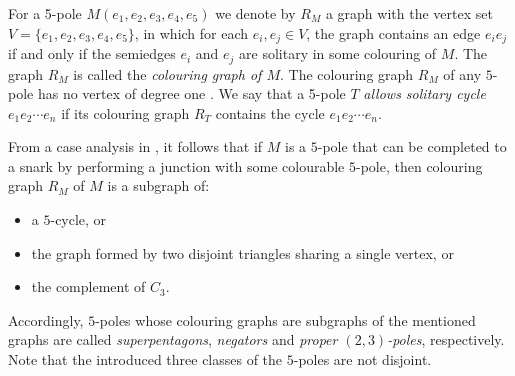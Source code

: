 For a 5-pole $M(e_1,e_2,e_3,e_4,e_5)$ we denote by $R_M$ a graph with the vertex set $V=\{e_1,e_2,e_3,e_4,e_5\}$, in which for each $e_i,e_j\in V$, the graph contains an edge $e_ie_j$ if and only if the semiedges $e_i$ and $e_j$ are solitary in some colouring of $M$. The graph $R_M$ is called the \textit{colouring graph of $M$}.
The colouring graph $R_M$ of any $5$-pole has no vertex of degree one \cite{Preissmann1983}. We say that a 5-pole $T$ \textit{allows solitary cycle} $e_1e_2\cdots e_n$ if its colouring graph $R_T$ contains the cycle $e_1e_2\cdots e_n$.

%
%

From a case analysis in \cite{Preissmann1983}, it follows that if $M$ is a $5$-pole that can be completed to a snark by performing a junction with some colourable $5$-pole, then colouring graph $R_{M}$ of $M$ is a subgraph of:
\begin{itemize}
\item a $5$-cycle, or
\item the graph formed by two disjoint triangles sharing a single vertex, or
\item the complement of $C_3$.
\end{itemize}
Accordingly, $5$-poles whose colouring graphs are subgraphs of the mentioned graphs are called \textit{superpentagons}, \textit{negators} and \textit{proper $(2 ,3)$-poles}, respectively. Note that the introduced three classes of the $5$-poles are not disjoint.

